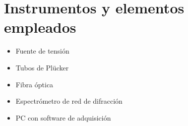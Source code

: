 \documentclass{article}
\newcommand{\nm}{\ \mathrm{nm}}
\begin{document}
\section{Instrumentos y elementos empleados}


\begin{itemize}
    \item Fuente de tensión
    \item Tubos de Plücker
    \item Fibra óptica
    \item Espectrómetro de red de difracción
    \item PC con software de adquisición
\end{itemize}
\end{document}
